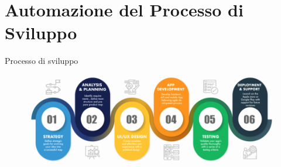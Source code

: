 
\section{Automazione del Processo di Sviluppo}

\begin{frame}{Processo di sviluppo}

    \begin{figure}[H]
        \includegraphics[width=1\textwidth]{img/sdlc2.png}
    \end{figure}

\end{frame}

